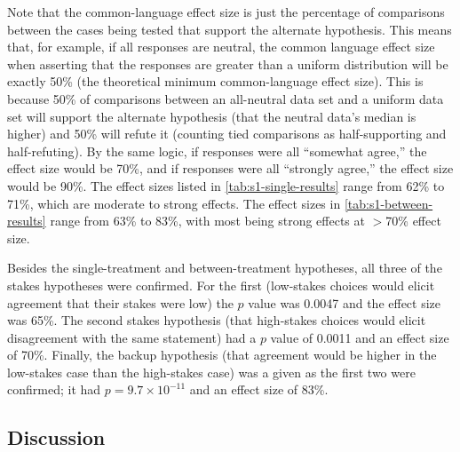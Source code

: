 Note that the common-language effect size is just the percentage of comparisons between the cases being tested that support the alternate hypothesis.
%
This means that, for example, if all responses are neutral, the common language effect size when asserting that the responses are greater than a uniform distribution will be exactly 50\% (the theoretical minimum common-language effect size).
%
This is because 50\% of comparisons between an all-neutral data set and a uniform data set will support the alternate hypothesis (that the neutral data's median is higher) and 50\% will refute it (counting tied comparisons as half-supporting and half-refuting).
%
By the same logic, if responses were all ``somewhat agree,'' the effect size would be 70\%, and if responses were all ``strongly agree,'' the effect size would be 90\%.
%
The effect sizes listed in \cref{tab:s1-single-results} range from 62\% to 71\%, which are moderate to strong effects.
%
The effect sizes in \cref{tab:s1-between-results} range from 63\% to 83\%, with most being strong effects at $>$70\% effect size.


Besides the single-treatment and between-treatment hypotheses, all three of the stakes hypotheses were confirmed.
%
For the first (low-stakes choices would elicit agreement that their stakes were low) the $p$ value was 0.0047 and the effect size was 65\%.
%
The second stakes hypothesis (that high-stakes choices would elicit disagreement with the same statement) had a $p$ value of 0.0011 and an effect size of 70\%.
%
Finally, the backup hypothesis (that agreement would be higher in the low-stakes case than the high-stakes case) was a given as the first two were confirmed; it had $p = 9.7\times10^{-11}$ and an effect size of 83\%.


\subsection{Discussion}

